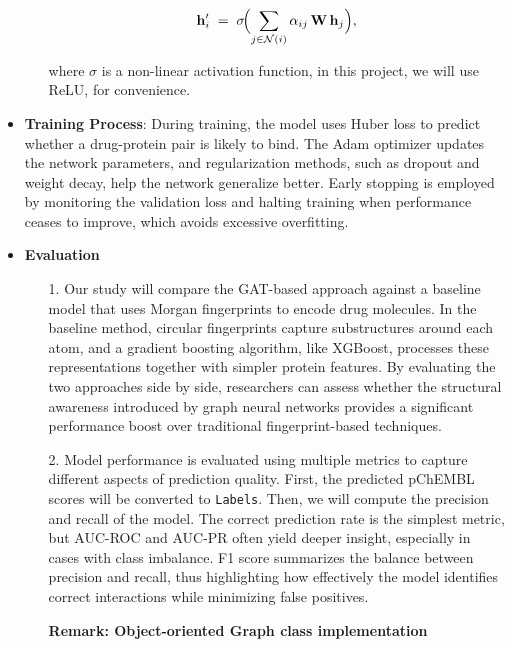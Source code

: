 \documentclass[fontsize=11pt]{article}
\begin{document}
\begin{itemize}
\begin{itemize}
            \[
                \mathbf{h}_i' \;=\;
                \sigma\!\Bigl(\sum_{j \in \mathcal{N}(i)}
                      \alpha_{ij}\,\mathbf{W}\,\mathbf{h}_j\Bigr),
            \]

            where $\sigma$ is a non-linear activation function, in this project, we will use ReLU, for convenience.
        \end{itemize}

    \item \textbf{Training Process}: During training, the model uses Huber loss to predict whether a drug-protein pair is likely to bind. The Adam optimizer updates the network parameters, and regularization methods, such as dropout and weight decay, help the network generalize better. Early stopping is employed by monitoring the validation loss and halting training when performance ceases to improve, which avoids excessive overfitting.

    \newpage

    \item \textbf{Evaluation}
    \begin{itemize}
        \item[1.] Our study will compare the GAT-based approach against a baseline model that uses Morgan fingerprints to encode drug molecules. In the baseline method, circular fingerprints capture substructures around each atom, and a gradient boosting algorithm, like XGBoost, processes these representations together with simpler protein features. By evaluating the two approaches side by side, researchers can assess whether the structural awareness introduced by graph neural networks provides a significant performance boost over traditional fingerprint-based techniques.

        \item[2.] Model performance is evaluated using multiple metrics to capture different aspects of prediction quality. First, the predicted pChEMBL scores will be converted to \texttt{Labels}. Then, we will compute the precision and recall of the model. The correct prediction rate is the simplest metric, but AUC-ROC and AUC-PR often yield deeper insight, especially in cases with class imbalance. F1 score summarizes the balance between precision and recall, thus highlighting how effectively the model identifies correct interactions while minimizing false positives.

        \small \textbf{Remark: Object-oriented Graph class implementation}



\end{itemize}
\end{itemize}
\end{document}
